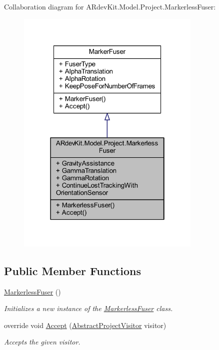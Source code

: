 Collaboration diagram for A\-Rdev\-Kit.\-Model.\-Project.\-Markerless\-Fuser\-:
\nopagebreak
\begin{figure}[H]
\begin{center}
\leavevmode
\includegraphics[width=250pt]{class_a_rdev_kit_1_1_model_1_1_project_1_1_markerless_fuser__coll__graph}
\end{center}
\end{figure}
\subsection*{Public Member Functions}
\begin{DoxyCompactItemize}
\item 
\hyperlink{class_a_rdev_kit_1_1_model_1_1_project_1_1_markerless_fuser_a9fb36e41c2ca7214045c3dfcd03adff3}{Markerless\-Fuser} ()
\begin{DoxyCompactList}\small\item\em Initializes a new instance of the \hyperlink{class_a_rdev_kit_1_1_model_1_1_project_1_1_markerless_fuser}{Markerless\-Fuser} class. \end{DoxyCompactList}\item 
override void \hyperlink{class_a_rdev_kit_1_1_model_1_1_project_1_1_markerless_fuser_af601b4bb51486b616355ba1ffeda4159}{Accept} (\hyperlink{class_a_rdev_kit_1_1_controller_1_1_project_controller_1_1_abstract_project_visitor}{Abstract\-Project\-Visitor} visitor)
\begin{DoxyCompactList}\small\item\em Accepts the given visitor. \end{DoxyCompactList}\end{DoxyCompactItemize}
